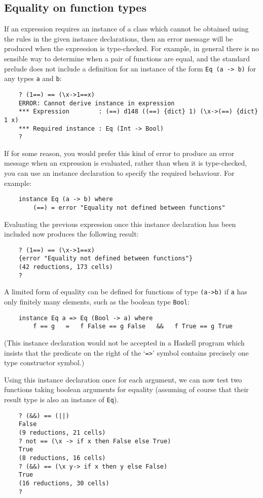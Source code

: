 \subsection{Equality on function types}
If an expression requires an  instance  of  a  class  which  cannot  be
obtained using the rules in the given instance  declarations,  then  an
error message will be produced when  the  expression  is  type-checked.
For example, in general there is no sensible way to  determine  when  a
pair of functions are equal, and the standard prelude does not  include
a definition for an instance of the form \verb"Eq (a -> b)" for  any  
types  \verb"a"
and \verb"b":
\begin{verbatim}
    ? (1==) == (\x->1==x)
    ERROR: Cannot derive instance in expression
    *** Expression        : (==) d148 ((==) {dict} 1) (\x->(==) {dict} 1 x)
    *** Required instance : Eq (Int -> Bool)
    ?
\end{verbatim}
If for some reason, you would prefer this kind of error to  produce  an
error message when an expression is evaluated, rather than when  it  is
type-checked, you can  use  an  instance  declaration  to  specify  the
required behaviour.  For example:
\begin{verbatim}
    instance Eq (a -> b) where 
        (==) = error "Equality not defined between functions"
\end{verbatim}
Evaluating the previous expression once this instance  declaration  has
been included now produces the following result:
\begin{verbatim}
    ? (1==) == (\x->1==x)
    {error "Equality not defined between functions"}
    (42 reductions, 173 cells)
    ? 
\end{verbatim}
A limited form of equality can be defined for functions of type  \verb"(a->b)"
if \verb"a" has only finitely many elements, such as the boolean 
type \verb"Bool":
\begin{verbatim}
    instance Eq a => Eq (Bool -> a) where
        f == g   =   f False == g False   &&   f True == g True
\end{verbatim}
(This instance declaration would not be accepted  in  a  Haskell
program which insists that the predicate  on  the  right  of  the  `\verb"=>"'
symbol contains precisely one type constructor symbol.)

Using this instance declaration once for each argument, we can now test
two functions taking boolean arguments for equality (assuming of course
that their result type is also an instance of \verb"Eq").
\begin{verbatim}
    ? (&&) == (||)
    False
    (9 reductions, 21 cells)
    ? not == (\x -> if x then False else True)
    True
    (8 reductions, 16 cells)
    ? (&&) == (\x y-> if x then y else False)
    True
    (16 reductions, 30 cells)
    ? 
\end{verbatim}

